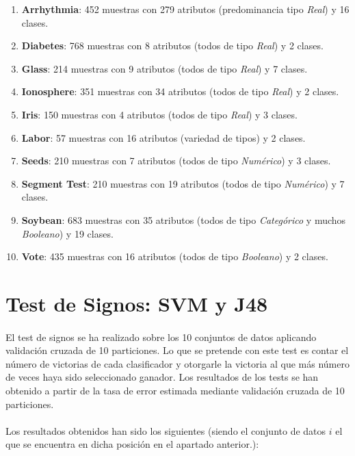\documentclass[10pt, a4paper,spanish]{article}
\begin{document}
			\begin{enumerate}
				\item \textbf{Arrhythmia}: 452 muestras con 279 atributos (predominancia tipo \emph{Real}) y 16 clases.
				\item \textbf{Diabetes}: 768 muestras con 8 atributos (todos de tipo \emph{Real}) y 2 clases.
				\item \textbf{Glass}: 214 muestras con 9 atributos (todos de tipo \emph{Real}) y 7 clases.
				\item \textbf{Ionosphere}: 351 muestras con 34 atributos (todos de tipo \emph{Real}) y 2 clases.
				\item \textbf{Iris}: 150 muestras con 4 atributos (todos de tipo \emph{Real}) y 3 clases.
				\item \textbf{Labor}: 57 muestras con 16 atributos (variedad de tipos) y 2 clases.
				\item \textbf{Seeds}: 210 muestras con 7 atributos (todos de tipo \emph{Numérico}) y 3 clases.
				\item \textbf{Segment Test}: 210 muestras con 19 atributos (todos de tipo \emph{Numérico}) y 7 clases.
				\item \textbf{Soybean}: 683 muestras con 35 atributos (todos de tipo \emph{Categórico} y muchos \emph{Booleano}) y 19 clases.
				\item \textbf{Vote}: 435 muestras con 16 atributos (todos de tipo \emph{Booleano}) y 2 clases.
			\end{enumerate}


	\section{Test de Signos: SVM y J48}

        \paragraph{}
		El test de signos se ha realizado sobre los 10 conjuntos de datos aplicando validación cruzada de 10 particiones. Lo que se pretende con este test es contar el número de victorias de cada clasificador y otorgarle la victoria al que más número de veces haya sido seleccionado ganador. Los resultados de los tests se han obtenido a partir de la tasa de error estimada mediante validación cruzada de 10 particiones.

		\paragraph{}
		Los resultados obtenidos han sido los siguientes (siendo el conjunto de datos $i$ el que se encuentra en dicha posición en el apartado anterior.):
\end{document}
